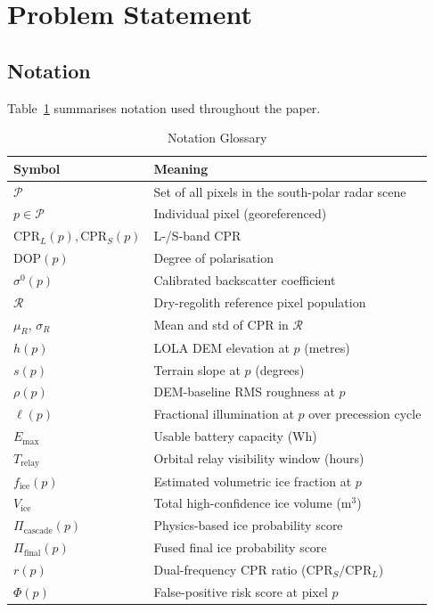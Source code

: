 \documentclass[10pt,conference]{IEEEtran}
\newcommand{\CPR}{\mathrm{CPR}}
\newcommand{\DOP}{\mathrm{DOP}}
\newcommand{\Fice}{f_{\mathrm{ice}}}
\newcommand{\Vice}{V_{\mathrm{ice}}}
\begin{document}
\section{Problem Statement}
\label{sec:problem}

\subsection{Notation}

Table~\ref{tab:notation} summarises notation used throughout the paper.

\begin{table}[htbp]
\caption{Notation Glossary}
\label{tab:notation}
\centering
\small
\setlength{\tabcolsep}{3pt}
\begin{tabular}{p{2.9cm}p{4.7cm}}
\toprule
Symbol & Meaning \\
\midrule
$\mathcal{P}$ & Set of all pixels in the south-polar radar scene \\
$p \in \mathcal{P}$ & Individual pixel (georeferenced) \\
$\CPR_L(p), \CPR_S(p)$ & L-/S-band CPR \\
$\DOP(p)$ & Degree of polarisation \\
$\sigma^0(p)$ & Calibrated backscatter coefficient \\
$\mathcal{R}$ & Dry-regolith reference pixel population \\
$\mu_R,\,\sigma_R$ & Mean and std of CPR in $\mathcal{R}$ \\
$h(p)$ & LOLA DEM elevation at $p$ (metres) \\
$s(p)$ & Terrain slope at $p$ (degrees) \\
$\rho(p)$ & DEM-baseline RMS roughness at $p$ \\
$\ell(p)$ & Fractional illumination at $p$ over precession cycle \\
$E_{\max}$ & Usable battery capacity (Wh) \\
$T_{\mathrm{relay}}$ & Orbital relay visibility window (hours) \\
$\Fice(p)$ & Estimated volumetric ice fraction at $p$ \\
$\Vice$ & Total high-confidence ice volume (m$^3$) \\
$\Pi_{\mathrm{cascade}}(p)$ & Physics-based ice probability score \\
$\Pi_{\mathrm{final}}(p)$ & Fused final ice probability score \\
$r(p)$ & Dual-frequency CPR ratio ($\CPR_S / \CPR_L$) \\
$\Phi(p)$ & False-positive risk score at pixel $p$ \\
\bottomrule
\end{tabular}
\end{table}
\end{document}
